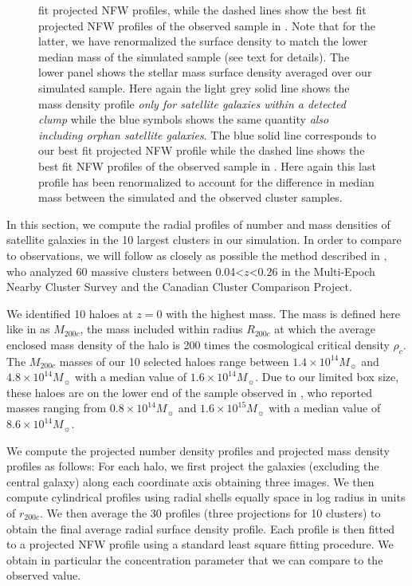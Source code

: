 \documentclass[a4paper,twocolumn,fleqn,usenatbib]{mnras}
\newcommand{\msol}{M_{\sun}}
\begin{document}
\begin{figure}
{    fit projected NFW  profiles, while the  dashed lines  show the best  
    fit projected NFW profiles of the observed sample in
    \citet{vanderburgEvidenceInsideoutGrowth2015}.  Note  that for the
    latter,  we have  renormalized the  surface density  to match  the
    lower median mass of the  simulated sample (see text for details).
    The lower  panel shows the  stellar mass surface  density averaged
    over our  simulated sample. Here  again the light grey  solid line
    shows the  mass density profile  {\it only for  satellite galaxies
      within a detected  clump} while the blue symbols  shows the same
    quantity {\it also including  orphan satellite galaxies}. The blue
    solid  line corresponds  to our  best  fit projected NFW  profile while  the
    dashed line shows the best fit NFW profiles of the observed sample
    in \citet{vanderburgEvidenceInsideoutGrowth2015}.  Here again this
    last profile has  been renormalized to account  for the difference
    in  median mass  between the  simulated and  the observed  cluster
    samples.}
%
  \label{fig:radial-profiles}
\end{figure}

In this  section, we compute  the radial  profiles of number  and mass
densities  of satellite  galaxies in  the 10  largest clusters  in our
simulation. In  order to  compare to observations,  we will  follow as
closely      as     possible      the     method      described     in
\citet{vanderburgEvidenceInsideoutGrowth2015}, who analyzed 60 massive
clusters between 0.04<$z$<0.26 in  the Multi-Epoch Nearby Cluster Survey
and the Canadian Cluster Comparison Project.

We identified 10  haloes at $z=0$ with the highest  mass.  The mass is
defined here like  in \citet{vanderburgEvidenceInsideoutGrowth2015} as
$M_{200c}$, the  mass included within  radius $R_{200c}$ at  which the
average  enclosed  mass   density  of  the  halo  is   200  times  the
cosmological critical density $\rho_c$.   The $M_{200c}$ masses of our
10 selected  haloes range between  $1.4 \times 10^{14}\msol$  and $4.8
\times 10^{14}\msol$ with a median value of $1.6 \times 10^{14}\msol$.
Due to our limited box size, these  haloes are on the lower end of the
sample observed  in \citet{vanderburgEvidenceInsideoutGrowth2015}, who
reported masses ranging from $0.8 \times 10^{14}\msol$ and $1.6 \times
10^{15}\msol$ with a median value of $8.6 \times 10^{14}\msol$.

We compute  the projected number  density profiles and  projected mass
density  profiles as  follows: For  each  halo, we  first project  the
galaxies  (excluding the  central galaxy)  along each  coordinate axis
obtaining three  images.  We  then compute cylindrical  profiles using
radial shells equally space in log  radius in units of $r_{200c}$.  We
then average  the 30 profiles  (three projections for 10 clusters) to
obtain the final average radial surface density profile.  Each profile
is then fitted to a projected NFW profile \citep{navarroStructureColdDark1996b} using a
standard least square fitting procedure.   We obtain in particular the
concentration parameter that we can compare to the observed value.
\end{document}
